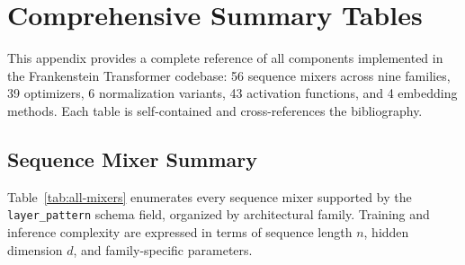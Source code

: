 \section{Comprehensive Summary Tables}
\label{sec:annex-summary-tables}

This appendix provides a complete reference of all components implemented in the Frankenstein Transformer codebase: 56 sequence mixers across nine families, 39 optimizers, 6 normalization variants, 43 activation functions, and 4 embedding methods. Each table is self-contained and cross-references the bibliography.

\subsection{Sequence Mixer Summary}

Table~\ref{tab:all-mixers} enumerates every sequence mixer supported by the \texttt{layer\_pattern} schema field, organized by architectural family. Training and inference complexity are expressed in terms of sequence length $n$, hidden dimension $d$, and family-specific parameters.

